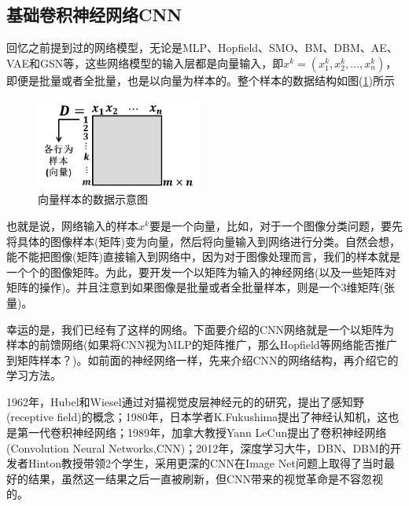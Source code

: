     \subsection{基础卷积神经网络CNN}
        \par
        回忆之前提到过的网络模型，无论是MLP、Hopfield、SMO、BM、DBM、AE、VAE和GSN等，这些网络模型的输入层都是向量输入，即$x^k = (x^k_1,x_2^k,\dots,x_n^k)$，即便是批量或者全批量，也是以向量为样本的。整个样本的数据结构如图(\ref{fig:向量样本的数据示意图})所示
            \begin{figure}[H]
            \centering
            \includegraphics[height=3cm]{images/Vector_sample_of_the_data.jpg}
            \caption{向量样本的数据示意图}
            \label{fig:向量样本的数据示意图}
            \end{figure}
        也就是说，网络输入的样本$x^k$要是一个向量，比如，对于一个图像分类问题，要先将具体的图像样本(矩阵)变为向量，然后将向量输入到网络进行分类。自然会想，能不能把图像(矩阵)直接输入到网络中，因为对于图像处理而言，我们的样本就是一个个的图像矩阵。为此，要开发一个以矩阵为输入的神经网络(以及一些矩阵对矩阵的操作)。并且注意到如果图像是批量或者全批量样本，则是一个3维矩阵(张量)。
        \par
        幸运的是，我们已经有了这样的网络。下面要介绍的CNN网络就是一个以矩阵为样本的前馈网络(如果将CNN视为MLP的矩阵推广，那么Hopfield等网络能否推广到矩阵样本？)。如前面的神经网络一样，先来介绍CNN的网络结构，再介绍它的学习方法。
        \par
        1962年，Hubel和Wiesel通过对猫视觉皮层神经元的的研究，提出了感知野(receptive field)的概念；1980年，日本学者K.Fukushima提出了神经认知机，这也是第一代卷积神经网络；1989年，加拿大教授Yann LeCun提出了卷积神经网络(Convolution Neural Networks,CNN)；2012年，深度学习大牛，DBN、DBM的开发者Hinton教授带领2个学生，采用更深的CNN在Image Net问题上取得了当时最好的结果，虽然这一结果之后一直被刷新，但CNN带来的视觉革命是不容忽视的。
